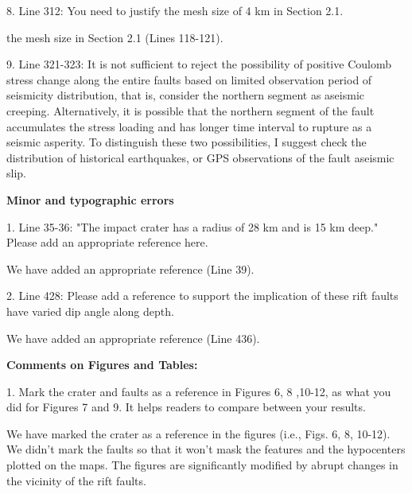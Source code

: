 \documentclass[12pt]{article}
\begin{document}
\begin{response}{8. Line 312: You need to justify the mesh size of 4 km in Section 2.1.}

   the mesh size in Section 2.1 (Lines 118-121).
\end{response}

\begin{response}{9. Line 321-323: It is not sufficient to reject the possibility of positive Coulomb stress change along the entire faults based on limited observation period of seismicity distribution, that is, consider the northern segment as aseismic creeping. Alternatively, it is possible that the northern segment of the fault accumulates the stress loading and has longer time interval to rupture as a seismic asperity. To distinguish these two possibilities, I suggest check the distribution of historical earthquakes, or GPS observations of the fault aseismic slip.}

\end{response}

\textbf{Minor and typographic errors} 

\begin{response}{1. Line 35-36: "The impact crater has a radius of 28 km and is 15 km deep." Please add an appropriate reference here.}

  We have added an appropriate reference (Line 39).
\end{response}

\begin{response}{2. Line 428: Please add a reference to support the implication of these rift faults have varied dip angle along depth.}

  We have added an appropriate reference (Line 436).
\end{response}

\textbf{Comments on Figures and Tables:}

\begin{response}{1. Mark the crater and faults as a reference in Figures 6, 8 ,10-12, as what you did for Figures 7 and 9. It helps readers to compare between your results.}

  We have marked the crater as a reference in the figures (i.e., Figs. 6, 8, 10-12). We didn't mark the faults so that it won't mask the features and the hypocenters plotted on the maps. The figures are significantly modified by abrupt changes in the vicinity of the rift faults.
\end{response}
\end{document}
